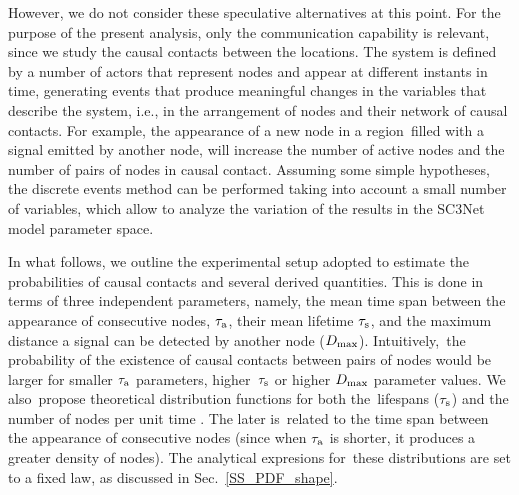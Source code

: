 \documentclass[crop]{CSLB}
\newcommand{\ceti}{node}
\newcommand{\cetis}{nodes}
\begin{document}
%
However, we do not consider these speculative alternatives at this
point.
%
For the purpose of the present analysis, only the communication
capability is relevant, since we study the causal contacts between the
locations.
%
The system is defined by a number of actors that represent \cetis{}
and appear at different instants in time, generating events that
produce meaningful changes in the variables that describe the system,
i.e., in the arrangement of \cetis{} and their network of causal
contacts.
%
For example, the appearance of a new \ceti{} in a region filled with a
signal emitted by another node, will increase the number of active
\cetis{} and the number of pairs of \cetis{} in causal contact.
%
Assuming some simple hypotheses, the discrete events method can be
performed taking into account a small number of variables, which allow
to analyze the variation of the results in the SC3Net model parameter
space.


In what follows, we outline the experimental setup adopted to estimate
the probabilities of causal contacts and several derived quantities.
%
This is done in terms of three independent parameters, namely, the
mean time span between the appearance of consecutive \cetis{},
$\tau_{\rm a}$, their mean lifetime $\tau_{\rm s}$, and the maximum
distance a signal can be detected by another \ceti{} ($D_{\rm max}$).
%
Intuitively, the probability of the existence of causal contacts
between pairs of \cetis{} would be larger for smaller $\tau_{\rm a}$
parameters, higher $\tau_{\rm s}$ or higher $D_{\rm max}$ parameter
values.
%
We also propose theoretical distribution functions for both
the lifespans ($\tau_{\rm s}$) and the number of \cetis{} per unit
time \citep{maccone_evolution_2014, Sotos_biotechnology_2019}.
%
The later is related to the time span between the appearance of
consecutive \cetis{} (since when $\tau_{\rm a}$ is shorter, it
produces a greater density of \cetis{}).
%
The analytical expresions for these distributions are set to a fixed
law, as discussed in Sec.~\ref{SS_PDF_shape}.  
    
     
\end{document}

